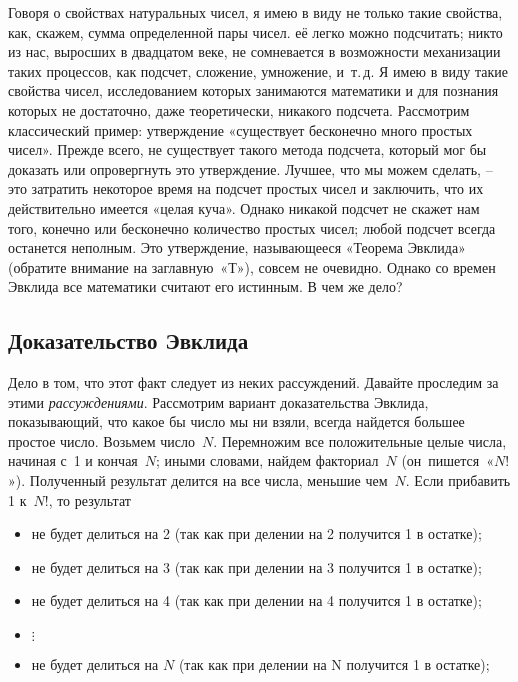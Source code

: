 \documentclass[../main.tex]{subfiles}
\begin{document}
Говоря о свойствах натуральных чисел, я имею в виду не только такие свойства, как, скажем, сумма определенной пары чисел. её легко можно подсчитать; никто из нас, выросших в двадцатом веке, не сомневается в возможности механизации таких процессов, как подсчет, сложение, умножение, и~т.\,д. Я имею в виду такие свойства чисел, исследованием которых занимаются математики и для познания которых не достаточно, даже теоретически, никакого подсчета. Рассмотрим классический пример: утверждение «существует бесконечно много простых чисел». Прежде всего, не существует такого метода подсчета, который мог бы доказать или опровергнуть это утверждение. Лучшее, что мы можем сделать, \--- это затратить некоторое время на подсчет простых чисел и заключить, что их действительно имеется «целая куча». Однако никакой подсчет не скажет нам того, конечно или бесконечно количество простых чисел; любой подсчет всегда останется неполным. Это утверждение, называющееся «Теорема Эвклида» (обратите внимание на заглавную~«Т»), совсем не очевидно. Однако со времен Эвклида все математики считают его истинным. В чем же дело?



\subsection{Доказательство Эвклида}

Дело в том, что этот факт следует из неких рассуждений. Давайте проследим за этими \emph{рассуждениями}. Рассмотрим вариант доказательства Эвклида, показывающий, что какое бы число мы ни взяли, всегда найдется большее простое число. Возьмем число~$N$. Перемножим все положительные целые числа, начиная с~1 и кончая~$N$; иными словами, найдем факториал~$N$ (он~пишется~«$N!$»). Полученный результат делится на все числа, меньшие чем~$N$. Если прибавить 1 к~$N!$, то результат
%
\begin{itemize}[label={}, noitemsep, topsep=6pt]
    \item не будет делиться на 2 (так как при делении на 2 получится 1 в остатке);
    \item не будет делиться на 3 (так как при делении на 3 получится 1 в остатке);
    \item не будет делиться на 4 (так как при делении на 4 получится 1 в остатке);
    \item $\vdots$
    \item не будет делиться на $N$ (так как при делении на N получится 1 в остатке);
\end{itemize}
\end{document}
